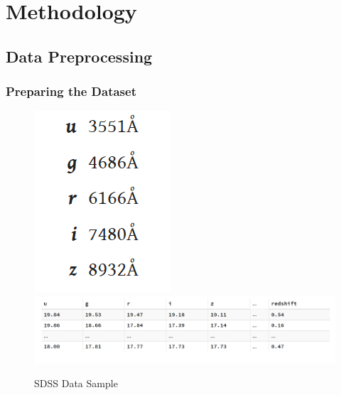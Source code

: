 \documentclass{beamer}
\begin{document}
\section{Methodology}
\subsection{Data Preprocessing}

\begin{frame}
	\frametitle{Preparing the Dataset}
    \begin{figure}
        \includegraphics[scale=0.5]{img/wavelengths.png}
        \includegraphics[scale=0.3]{img/sdss_data.png}
        \caption*{SDSS Data Sample}
    \end{figure}
    \end{frame}
\end{document}
